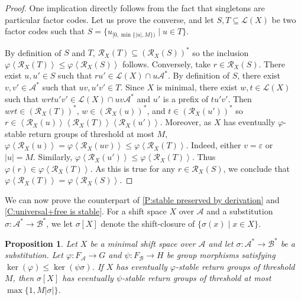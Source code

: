 \documentclass{amsart}
\newcommand*{\ret}{\mathcal{R}}
\newcommand*{\lang}{\mathcal{L}}
\newcommand*{\cA}{\mathcal{A}}
\newcommand*{\cB}{\mathcal{B}}
\newcommand*{\from}{\colon}
\newcommand*{\emptyw}{\varepsilon}
\newcommand*{\gen}[1]{\left\langle #1\right\rangle}
\theoremstyle{plain}
\newtheorem{proposition}[theorem]{Proposition}
\theoremstyle{definition}
\theoremstyle{remark}
\begin{document}
\begin{proof}
    One implication directly follows from the fact that singletons are particular factor codes. Let us prove the converse, and let $S,T \subseteq \lang(X)$ be two factor codes such that $S = \{u_{[0,\min\{|u|,M\})} \mid u \in T\}$.

    By definition of $S$ and $T$, $\ret_X(T) \subseteq (\ret_X(S))^*$ so the inclusion $\varphi\gen{\ret_X(T)} \leq \varphi\gen{\ret_X(S)}$ follows. Conversely, take $r \in \ret_X(S)$. There exist $u, u' \in S$ such that $ru' \in \lang(X) \cap u \cA^*$. By definition of $S$, there exist $v, v' \in \cA^*$ such that $uv, u'v' \in T$. Since $X$ is minimal, there exist $w, t \in \lang(X)$ such that $wrtu'v' \in \lang(X) \cap uv \cA^*$ and $u'$ is a prefix of $tu'v'$. Then $wrt \in (\ret_X(T))^*$, $w \in (\ret_X(u))^*$, and $t \in (\ret_X(u'))^*$ so $r \in \gen{\ret_X(u)}\gen{\ret_X(T)}\gen{\ret_X(u')}$. Moreover, as $X$ has eventually $\varphi$-stable return groups of threshold at most $M$, $\varphi\gen{\ret_X(u)} = \varphi\gen{\ret_X(uv)} \leq \varphi\gen{\ret_X(T)}$. Indeed, either $v = \emptyw$ or $|u| = M$. Similarly, $\varphi\gen{\ret_X(u')} \leq \varphi\gen{\ret_X(T)}$. Thus $\varphi(r) \in \varphi\gen{\ret_X(T)}$. As this is true for any $r \in \ret_X(S)$, we conclude that $\varphi\gen{\ret_X(T)} = \varphi\gen{\ret_X(S)}$.
\end{proof}

We can now prove the counterpart of \cref{P:stable preserved by derivation} and \cref{C:universal+free is stable}. For a shift space $X$ over $\cA$ and a substitution $\sigma \from \cA^* \to \cB^*$, we let $\sigma[X]$ denote the shift-closure of $\{\sigma(x) \mid x \in X\}$.

\begin{proposition}\label{P:eventual stability preserved by substitution}
    Let $X$ be a minimal shift space over $\cA$ and let $\sigma\from \cA^* \to \cB^*$ be a substitution. Let $\varphi\from F_\cA \to G$ and $\psi\from F_\cB \to H$ be group morphisms satisfying $\ker(\varphi) \leq \ker(\psi\sigma)$. If $X$ has eventually $\varphi$-stable return groups of threshold $M$, then $\sigma[X]$ has eventually $\psi$-stable return groups of threshold at most $\max\{1,M|\sigma|\}$.
\end{proposition}
\end{document}
